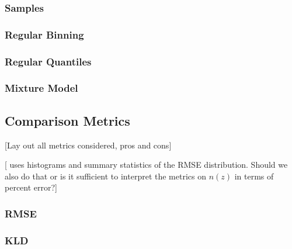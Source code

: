 \documentclass[\docopts]{\docclass}
\begin{document}
\subsubsection{Samples}
\label{sec:samples}

\subsubsection{Regular Binning}
\label{sec:bins}

\subsubsection{Regular Quantiles}
\label{sec:quantiles}

\subsubsection{Mixture Model}
\label{sec:gmm}

\subsection{Comparison Metrics}
\label{sec:metrics}

[Lay out all metrics considered, pros and cons]

[\citet{carrasco_kind_sparse_2014} uses histograms and summary statistics of the RMSE distribution.  Should we also do that or is it sufficient to interpret the metrics on $n(z)$ in terms of percent error?]

\subsubsection{RMSE}
\label{sec:rms}

\subsubsection{KLD}
\label{sec:kld}



\end{document}
